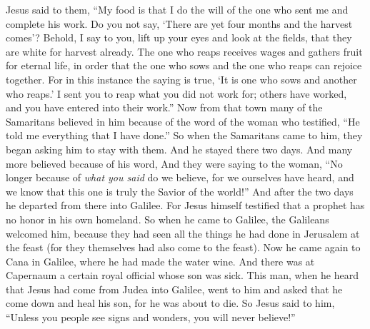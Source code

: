 \begin{biblechapter}
\verse Jesus said to them, “My food is that I do the will of the one who sent me and complete his work.
\verse Do you not say, ‘There are yet four months and the harvest comes’? Behold, I say to you, lift up your eyes and look at the fields, that they are white for harvest already.
\verse The one who reaps receives wages and gathers fruit for eternal life, in order that the one who sows and the one who reaps can rejoice together.
\verse For in this instance the saying is true, ‘It is one who sows and another who reaps.’
\verse I sent you to reap what you did not work for; others have worked, and you have entered into their work.”
 Now from that town many of the Samaritans believed in him because of the word of the woman who testified, “He told me everything that I have done.”
\verse So when the Samaritans came to him, they began asking him to stay with them. And he stayed there two days.
\verse And many more believed because of his word,
\verse And they were saying to the woman, “No longer because of \textit{what you said} do we believe, for we ourselves have heard, and we know that this one is truly the Savior of the world!”
 And after the two days he departed from there into Galilee.
\verse For Jesus himself testified that a prophet has no honor in his own homeland.
\verse So when he came to Galilee, the Galileans welcomed him, because they had seen all the things he had done in Jerusalem at the feast (for they themselves had also come to the feast).
 Now he came again to Cana in Galilee, where he had made the water wine. And there was at Capernaum a certain royal official whose son was sick.
\verse This man, when he heard that Jesus had come from Judea into Galilee, went to him and asked that he come down and heal his son, for he was about to die.
\verse So Jesus said to him, “Unless you people see signs and wonders, you will never believe!”

\end{biblechapter}
